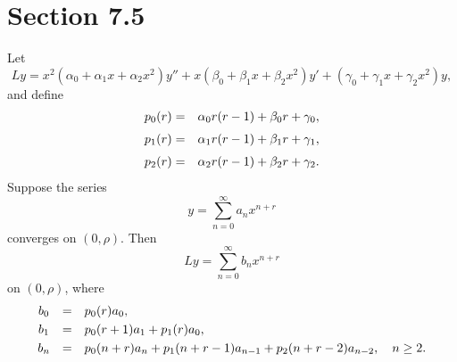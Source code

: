 \section*{Section 7.5}
\setcounter{chapter}{7}
\setcounter{section}{5}

\setcounter{theorem}{0}
\setcounter{equation}{2}
\begin{theorem}
  \label{thmtype:7.5.1} Let
  \[
    Ly= x^{2}(\alpha_{0}+\alpha_{1}x+\alpha_{2}x^{2})y''+x(\beta_{0}+\beta_{1}x+\beta_{2}x^{2})y' +(\gamma_{0}+\gamma_{1}x+\gamma_{2}x^{2})y,
  \]
  and define
  \begin{eqnarray*}
    p_{0}(r)&=&\alpha_{0}r(r-1)+\beta_{0}r+\gamma_{0},\\[1\jot] p_{1}(r)&=&\alpha_{1}r(r-1)+\beta_{1}r+\gamma_{1},\\[1\jot] p_{2}(r)&=&\alpha_{2}r(r-1)+\beta_{2}r+\gamma_{2}.\\
  \end{eqnarray*}
  Suppose the series
  \begin{equation}
    \label{eq:7.5.3}y=\sum_{n=0}^{\infty}a_{n}x^{n+r}
  \end{equation}
  converges on $(0,\rho)$. Then
  \begin{equation}
    \label{eq:7.5.4}Ly=\sum_{n=0}^{\infty}b_{n}x^{n+r}
  \end{equation}
  on $(0,\rho)$, where
  \begin{equation}
    \label{eq:7.5.5}
    \begin{array}{ccl}
      b_{0} & = & p_{0}(r)a_{0},                                                       \\[1\jot]
      b_{1} & = & p_{0}(r+1)a_{1}+p_{1}(r)a_{0},                                       \\[1\jot]
      b_{n} & = & p_{0}(n+r)a_{n}+p_{1}(n+r-1)a_{n-1}+p_{2}(n+r-2)a_{n-2},\quad n\ge2.
    \end{array}
  \end{equation}
\end{theorem}

